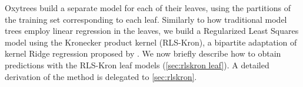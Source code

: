 \documentclass[sn-mathphys-num]{sn-jnl}%
\theoremstyle{thmstyleone}%
\theoremstyle{thmstyletwo}%
\theoremstyle{thmstylethree}%
\begin{document}
Oxytrees build a separate model for each of their leaves, using the partitions of the training set corresponding to each leaf. Similarly to how traditional model trees employ linear regression in the leaves, we build a Regularized Least Squares model using the Kronecker product kernel (RLS-Kron), a bipartite adaptation of kernel Ridge regression proposed by \citet{van_laarhoven_gaussian_2011}. We now briefly describe how to obtain predictions with the RLS-Kron leaf models (\autoref{sec:rlskron leaf}). A detailed derivation of the method is delegated to \autoref{sec:rlskron}.
%
%
%

% 
% 
% 
% 
\end{document}
